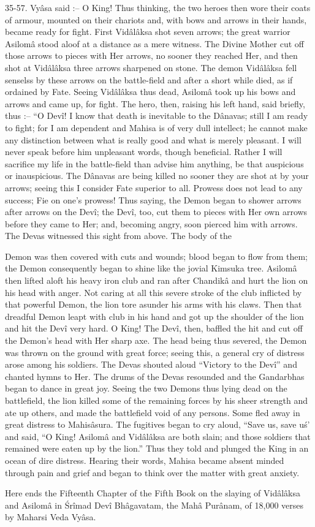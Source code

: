 35-57. Vy\^asa said :-- O King! Thus thinking, the two heroes then wore their coats of armour, mounted on their chariots and, with bows and arrows in their hands, became ready for fight. First Vid\^al\^aksa shot seven arrows; the great warrior Asilom\^a stood aloof at a distance as a mere witness. The Divine Mother cut off those arrows to pieces with Her arrows, no sooner they reached Her, and then shot at Vid\^al\^aksa three arrows sharpened on stone. The demon Vid\^al\^aksa fell senselss by these arrows on the battle-field and after a short while died, as if ordained by Fate. Seeing Vid\^al\^aksa thus dead, Asilom\^a took up his bows and arrows and came up, for fight. The hero, then, raising his left hand, said briefly, thus :-- ``O Dev\^i! I know that death is inevitable to the D\^anavas; still I am ready to fight; for I am dependent and Mahisa is of very dull intellect; he cannot make any distinction between what is really good and what is merely pleasant. I will never speak before him unpleasant words, though beneficial. Rather I will sacrifice my life in the battle-field than advise him anything, be that auspicious or inauspicious. The D\^anavas are being killed no sooner they are shot at by your arrows; seeing this I consider Fate superior to all. Prowess does not lead to any success; Fie on one's prowess! Thus saying, the Demon began to shower arrows after arrows on the Dev\^i; the Dev\^i, too, cut them to pieces with Her own arrows before they came to Her; and, becoming angry, soon pierced him with arrows. The Devas witnessed this sight from above. The body of the

Demon was then covered with cuts and wounds; blood began to flow from them; the Demon consequently began to shine like the jovial Kimsuka tree. Asilom\^a then lifted aloft his heavy iron club and ran after Chandik\^a and hurt the lion on his head with anger. Not caring at all this severe stroke of the club inflicted by that powerful Demon, the lion tore asunder his arms with his claws. Then that dreadful Demon leapt with club in his hand and got up the shoulder of the lion and hit the Dev\^i very hard. O King! The Dev\^i, then, baffled the hit and cut off the Demon's head with Her sharp axe. The head being thus severed, the Demon was thrown on the ground with great force; seeing this, a general cry of distress arose among his soldiers. The Devas shouted aloud ``Victory to the Dev\^i'' and chanted hymns to Her. The drums of the Devas resounded and the Gandarbhas began to dance in great joy. Seeing the two Demons thus lying dead on the battlefield, the lion killed some of the remaining forces by his sheer strength and ate up others, and made the battlefield void of any persons. Some fled away in great distress to Mahis\^asura. The fugitives began to cry aloud, ``Save us, save u\'s' and said, ``O King! Asilom\^a and Vid\^al\^aksa are both slain; and those soldiers that remained were eaten up by the lion.'' Thus they told and plunged the King in an ocean of dire distress. Hearing their words, Mahisa became absent minded through pain and grief and began to think over the matter with great anxiety.

Here ends the Fifteenth Chapter of the Fifth Book on the slaying of Vid\^al\^aksa and Asilom\^a in \'Sr\^imad Dev\^i Bh\^agavatam, the Mah\^a Pur\^anam, of 18,000 verses by Maharsi Veda Vy\^asa.
